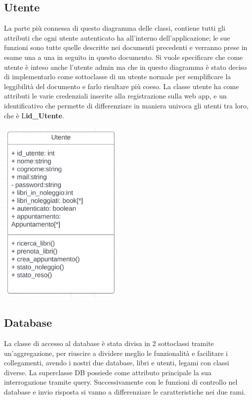 \documentclass{article}
\begin{document}
\subsection{Utente} 
La parte più connessa di questo diagramma delle classi, contiene tutti gli attributi che ogni utente autenticato ha all'interno dell’applicazione; le sue funzioni sono tutte quelle descritte nei documenti precedenti e verranno prese in esame una a una in seguito in questo documento. Si vuole specificare che come utente è inteso anche l’utente admin ma che in questo diagramma è stato  deciso di implementarlo come sottoclasse di un utente normale per semplificare la leggibilità del documento e farlo risultare più coeso. La classe utente ha come attributi le varie credenziali inserite alla registrazione sulla web app, e un identificativo che permette di differenziare in maniera univoca gli utenti tra loro, che è L\textbf{id\_Utente}.
\begin{center}
        \includegraphics[width=60mm]{D3/Images/Utente.png}
\end{center}

\subsection{Database}La classe di accesso al database è stata divisa in 2 sottoclassi tramite un’aggregazione,  per riuscire a dividere meglio le funzionalità e facilitare i collegamenti, avendo i nostri due database, libri e utenti, legami con classi diverse. La superclasse DB possiede come attributo principale la sua interrogazione tramite query. Successivamente  con le funzioni di controllo nel database e invio risposta si vanno a differenziare le caratteristiche nei due rami.
\end{document}
